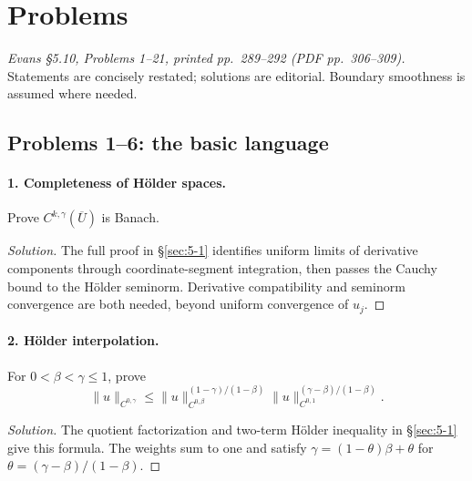\section{Problems}
\label{sec:5-10}

\noindent\textit{Evans \S5.10, Problems 1--21, printed pp.~289--292
(PDF pp.~306--309).} Statements are concisely restated; solutions are
editorial. Boundary smoothness is assumed where needed.

\subsection{Problems 1--6: the basic language}
\paragraph{1. Completeness of H\"older spaces.}
Prove $C^{k,\gamma}(\overline U)$ is Banach.
\begin{proof}[Solution]
The full proof in \S\ref{sec:5-1} identifies uniform limits of derivative
components through coordinate-segment integration, then passes the
Cauchy bound to the H\"older seminorm. Derivative compatibility and
seminorm convergence are both needed, beyond uniform convergence of $u_j$.
\end{proof}

\paragraph{2. H\"older interpolation.}
For $0<\beta<\gamma\leq1$, prove
\[
 \|u\|_{C^{0,\gamma}}
 \leq\|u\|_{C^{0,\beta}}^{(1-\gamma)/(1-\beta)}
      \|u\|_{C^{0,1}}^{(\gamma-\beta)/(1-\beta)}.
\]
\begin{proof}[Solution]
The quotient factorization and two-term H\"older inequality in
\S\ref{sec:5-1} give this formula. The weights sum to one and satisfy
$\gamma=(1-\theta)\beta+\theta$ for
$\theta=(\gamma-\beta)/(1-\beta)$.
\end{proof}

